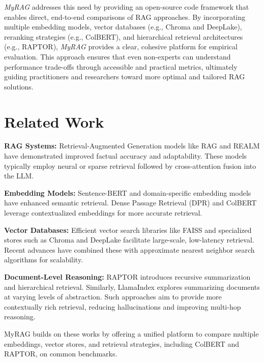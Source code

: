 \documentclass{scrartcl}
\begin{document}
\textit{MyRAG} addresses this need by providing an open-source code framework that enables direct, end-to-end comparisons of RAG approaches. By incorporating multiple embedding models, vector databases (e.g., Chroma and DeepLake), reranking strategies (e.g., ColBERT), and hierarchical retrieval architectures (e.g., RAPTOR), \textit{MyRAG} provides a clear, cohesive platform for empirical evaluation. This approach ensures that even non-experts can understand performance trade-offs through accessible and practical metrics, ultimately guiding practitioners and researchers toward more optimal and tailored RAG solutions.

\section{Related Work}

\textbf{RAG Systems:} Retrieval-Augmented Generation models like RAG \cite{lewis2020retrieval} and REALM \cite{guu2020realm} have demonstrated improved factual accuracy and adaptability. These models typically employ neural or sparse retrieval followed by cross-attention fusion into the LLM. 

\textbf{Embedding Models:} Sentence-BERT \cite{reimers2019sentence} and domain-specific embedding models have enhanced semantic retrieval. Dense Passage Retrieval (DPR) \cite{karpukhin2020dense} and ColBERT \cite{khattab2020colbert} leverage contextualized embeddings for more accurate retrieval.

\textbf{Vector Databases:} Efficient vector search libraries like FAISS \cite{johnson2019billion} and specialized stores such as Chroma and DeepLake facilitate large-scale, low-latency retrieval. Recent advances have combined these with approximate nearest neighbor search algorithms for scalability.

\textbf{Document-Level Reasoning:} RAPTOR \cite{wu2021recursively, raptor2024} introduces recursive summarization and hierarchical retrieval. Similarly, LlamaIndex \cite{liu2022llamaindex} explores summarizing documents at varying levels of abstraction. Such approaches aim to provide more contextually rich retrieval, reducing hallucinations and improving multi-hop reasoning.

MyRAG builds on these works by offering a unified platform to compare multiple embeddings, vector stores, and retrieval strategies, including ColBERT and RAPTOR, on common benchmarks.

\end{document}
